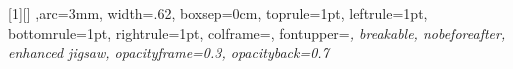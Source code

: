 [1][]{
    ,arc=3mm,
width=.62\textwidth,%
    boxsep=0cm,
    toprule=1pt,
    leftrule=1pt,
    bottomrule=1pt,
    rightrule=1pt,
    colframe=\TitlePageColor,
    fontupper=\raggedleft\fontsize{16pt}{14pt}\itshape,
    breakable,
    nobeforeafter,
    enhanced jigsaw,
    opacityframe=0.3,
    opacityback=0.7
}
\makeatother







